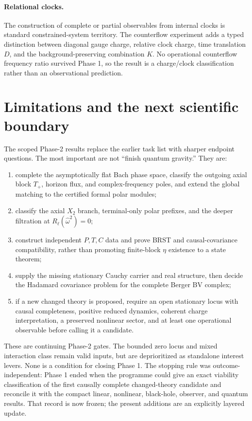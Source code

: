 \documentclass[11pt]{article}
\begin{document}
\paragraph{Relational clocks.}
The construction of complete or partial observables from internal clocks is
standard constrained-system territory\cite{Dittrich}.  The counterflow
experiment adds a typed distinction between diagonal gauge charge, relative
clock charge, time translation $D$, and the background-preserving combination
$K$.  No operational counterflow frequency ratio survived Phase 1, so the
result is a charge/clock classification rather than an observational
prediction.

\section{Limitations and the next scientific boundary}

The scoped Phase-2 results replace the earlier task list with sharper
endpoint questions.  The most important are not ``finish quantum gravity.''  They are:
\begin{enumerate}
\item complete the asymptotically flat Bach phase space, classify the
outgoing axial block \(T_+\), horizon flux, and complex-frequency poles, and
extend the global matching to the certified formal polar modules;
\item classify the axial $X_2$ branch, terminal-only polar prefixes, and the
deeper filtration at $R_\ell(\widehat\omega^2)=0$;
\item construct independent $P,T,C$ data and prove BRST and causal-covariance
compatibility, rather than promoting finite-block $\eta$ existence to a
state theorem;
\item supply the missing stationary Cauchy carrier and real structure, then
decide the Hadamard covariance problem for the complete Berger BV complex;
\item if a new changed theory is proposed, require an open stationary locus
with causal completeness, positive reduced dynamics, coherent charge
interpretation, a preserved nonlinear sector, and at least one operational
observable before calling it a candidate.
\end{enumerate}

These are continuing Phase-2 gates.  The bounded zero locus and mixed
interaction class remain valid inputs, but are deprioritized as standalone
interest levers.  None is a condition for closing Phase 1.  The stopping rule
was outcome-independent: Phase 1 ended
when the programme could give an exact viability classification of the first
causally complete changed-theory candidate and reconcile it with the compact
linear, nonlinear, black-hole, observer, and quantum results.  That record is
now frozen; the present additions are an explicitly layered update.
\end{document}
